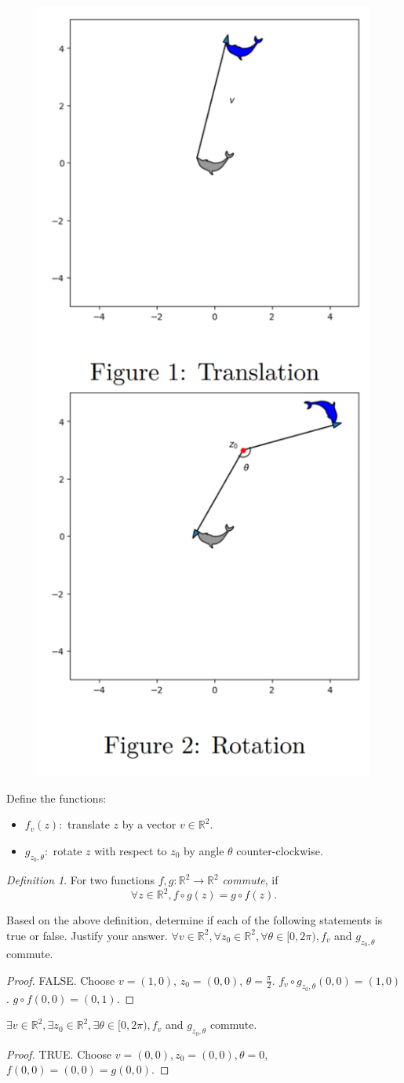 \documentclass{homework}
\theoremstyle{remark}
\newtheorem*{definition}{Definition}
\newcommand{\?}{\stackrel{?}{=}}
\begin{document}
\begin{figure}
    \centering
    \includegraphics[width=0.5\linewidth]{Homework 2.png}
\end{figure}

Define the functions:
\begin{itemize}
    \item $f_v(z):$ translate $z$ by a vector $v\in\mathbb{R}^2$. 
    \item $g_{z_0,\theta}:$ rotate $z$ with respect to $z_0$ by angle $\theta$ counter-clockwise. 
\end{itemize}

\begin{definition}
    For two functions $f,g:\mathbb{R}^2\rightarrow\mathbb{R}^2$ \textit{commute}, if $$\forall z\in\mathbb{R}^2, f\circ g(z) = g\circ f(z).$$
\end{definition}
 Based on the above definition, determine if each of the following statements is true or false. Justify your answer. 
\question  $\forall v\in\mathbb{R}^2, \forall z_0\in\mathbb{R}^2, \forall\theta\in[0,2\pi), f_v$ and $g_{z_0,\theta}$ commute. 
\begin{proof}
    FALSE. Choose $v=(1,0)$, $z_0=(0,0)$, $\theta=\frac{\pi}2$. $f_v\circ g_{z_0,\theta}(0,0)=(1,0)$. $g\circ f(0,0)=(0,1)$.   
\end{proof}

\question $\exists v\in\mathbb{R}^2, \exists z_0\in\mathbb{R}^2, \exists\theta\in[0,2\pi), f_v$ and $g_{z_0,\theta}$ commute. 
\begin{proof}
    TRUE. Choose $v=(0,0), z_0=(0,0),\theta=0$, $f(0,0)=(0,0)=g(0,0)$. 
\end{proof}
\end{document}
